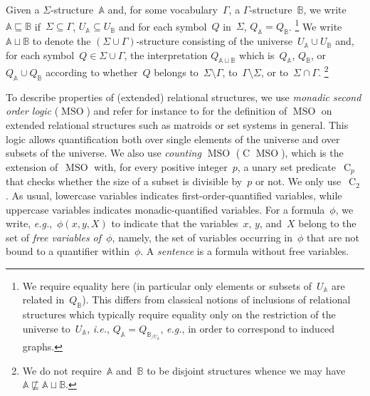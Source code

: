 \documentclass{lmcs} %
\newcommand*\defd[2][\em\color{red!25!black}]{{#1#2}}
\newcommand{\MSO}{\ensuremath{\operatorname{MSO}}\xspace}
\newcommand{\CMSO}[1][]{\ensuremath{\C[#1]{\!\!}\MSO}\xspace}
\newcommand{\C}[1][]{\ensuremath{\operatorname{C}_{#1}}\xspace}
\def\eg{{\em e.g.}}
\def\ie{{\em i.e.}}
\begin{document}
Given a $\Sigma$-structure~$\mathbb{A}$
and,
for some vocabulary~$\Gamma$,
a $\Gamma$-structure~$\mathbb{B}$,
we write~\defd{$\mathbb{A}\sqsubseteq\mathbb{B}$}
if~$\Sigma\subseteq\Gamma$,
$U_{\mathbb{A}}\subseteq U_{\mathbb{B}}$
and for each symbol~$Q$ in~$\Sigma$,
$Q_{\mathbb{A}}=Q_{\mathbb{B}}$.%
\footnote{%
    We require equality here
    (in particular only elements or subsets of~$U_{\mathbb{A}}$ are related in~$Q_{\mathbb{B}}$).
    This differs from classical notions of inclusions of relational structures
    which typically require equality only on the restriction of the universe to~$U_{\mathbb{A}}$,
    \ie, $Q_{\mathbb{A}}=Q_{\mathbb{B}_{/U_{\mathbb{A}}}}$,
    \eg, in order to correspond to induced graphs.%
}
We write~\defd{$\mathbb{A}\sqcup\mathbb{B}$}
to denote the $(\Sigma\cup\Gamma)$-structure
consisting of the universe~$U_{\mathbb{A}}\cup U_{\mathbb{B}}$
and, for each symbol~$Q\in\Sigma\cup\Gamma$,
the interpretation $Q_{\mathbb{A}\sqcup\mathbb{B}}$
which is~$Q_{\mathbb{A}}$, $Q_{\mathbb{B}}$, or~$Q_{\mathbb{A}}\cup Q_{\mathbb{B}}$
according to whether~$Q$ belongs to~$\Sigma\setminus\Gamma$, to~$\Gamma\setminus\Sigma$, or to~$\Sigma\cap\Gamma$.%
\footnote{%
    We do not require~$\mathbb{A}$ and~$\mathbb{B}$ to be disjoint structures
    whence we may have~$\mathbb{A}\not\sqsubseteq\mathbb{A}\sqcup\mathbb{B}$.%
}

To describe properties of (extended) relational structures, we use \defd{monadic second order logic} (\defd{\MSO}) and refer for instance to
\cite{CE09,FunkMN22,Hlineny06,Strozecki11} for the definition of \MSO on extended relational structures such as matroids or set systems in general. This logic allows quantification both over single elements of the universe
and over subsets of the universe. We also use \defd{counting \MSO} (\defd{\CMSO}), which is the extension of~$\MSO$ with, for every positive integer~$p$, a
unary set predicate~$\C[p]$ that checks whether the size of a subset is divisible by~$p$ or not. We only use~$\C[2]$.
%
As usual, lowercase variables indicates first-order-quantified variables,
while uppercase variables indicates monadic-quantified variables.
For a formula~$\phi$, we write, \eg,~$\phi(x,y,X)$ to indicate that the variables~$x$, $y$, and~$X$ belong to the set of \defd{free variables of~$\phi$},
namely, the set of variables occurring in~$\phi$ that are not bound to a quantifier within~$\phi$.
A \defd{sentence} is a formula without free variables.
\smallbreak
\end{document}
